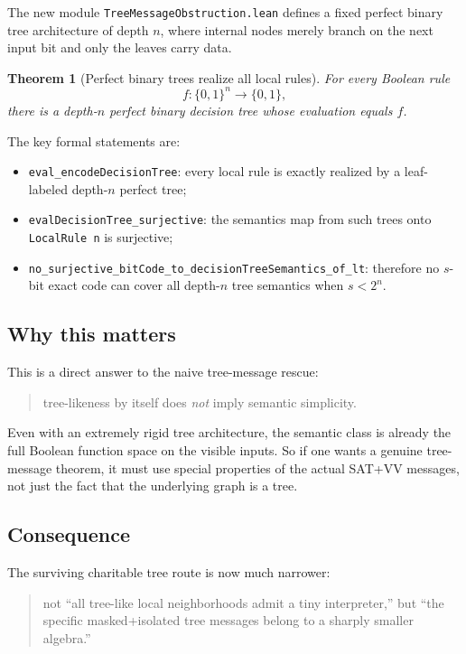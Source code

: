 \documentclass[11pt]{article}
\newtheorem{theorem}{Theorem}[section]
\theoremstyle{remark}
\begin{document}
The new module \texttt{TreeMessageObstruction.lean} defines a fixed perfect binary tree
architecture of depth \(n\), where internal nodes merely branch on the next input bit and only the
leaves carry data.

\begin{theorem}[Perfect binary trees realize all local rules]
For every Boolean rule
\[
  f : \{0,1\}^n \to \{0,1\},
\]
there is a depth-\(n\) perfect binary decision tree whose evaluation equals \(f\).
\end{theorem}

\noindent
The key formal statements are:
\begin{itemize}[leftmargin=1.5em]
  \item \texttt{eval\_encodeDecisionTree}: every local rule is exactly realized by a leaf-labeled
  depth-\(n\) perfect tree;
  \item \texttt{evalDecisionTree\_surjective}: the semantics map from such trees onto
  \texttt{LocalRule n} is surjective;
  \item \texttt{no\_surjective\_bitCode\_to\_decisionTreeSemantics\_of\_lt}: therefore no
  \(s\)-bit exact code can cover all depth-\(n\) tree semantics when \(s < 2^n\).
\end{itemize}

\subsection{Why this matters}

This is a direct answer to the naive tree-message rescue:

\begin{quote}
tree-likeness by itself does \emph{not} imply semantic simplicity.
\end{quote}

Even with an extremely rigid tree architecture, the semantic class is already the full Boolean
function space on the visible inputs.  So if one wants a genuine tree-message theorem, it must use
special properties of the actual SAT+VV messages, not just the fact that the underlying graph is a
tree.

\subsection{Consequence}

The surviving charitable tree route is now much narrower:
\begin{quote}
not ``all tree-like local neighborhoods admit a tiny interpreter,''
but ``the specific masked+isolated tree messages belong to a sharply smaller algebra.''
\end{quote}
\end{document}
